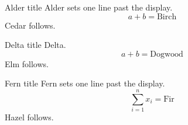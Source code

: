 \documentclass{beamer}
\begin{document}
\begin{frame}[t]{Alder title}
Alder sets one line past the display.
\[ a + b = \text{Birch} \]
Cedar follows.
\end{frame}
\begin{frame}[t]{Delta title}
Delta.
\[ a + b = \text{Dogwood} \]
Elm follows.
\end{frame}
\begin{frame}[t]{Fern title}
Fern sets one line past the display.
\[ \sum_{i=1}^{n} x_{i} = \text{Fir} \]
Hazel follows.
\end{frame}
\end{document}
